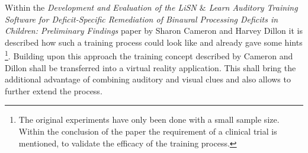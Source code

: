 \documentclass[a4paper,11pt]{article}%
\renewcommand{\\}{\vspace*{0.5\baselineskip} \newline}
\begin{document}
\newline
\newline
Within the \textit{Development and Evaluation of the \ac{LiSN} $\&$ Learn Auditory Training Software for Deficit-Specific Remediation of Binaural Processing Deficits in Children: Preliminary Findings} \cite{LISN-A} paper by Sharon Cameron and Harvey Dillon it is described how such a training process could look like and already gave some hints \footnote{The original experiments have only been done with a small sample size. Within the conclusion of the paper the requirement of a clinical trial is mentioned, to validate the efficacy of the training process.}.
\newline
\newline
Building upon this approach the training concept described by Cameron and Dillon shall be transferred into a virtual reality application. This shall bring the additional advantage of combining auditory and visual clues and also allows to further extend the process. 
\end{document}
